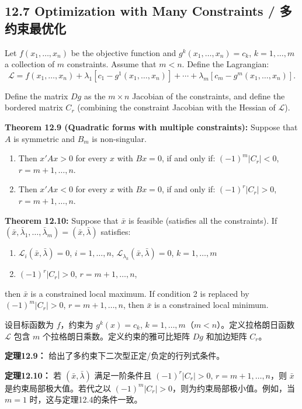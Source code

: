 \subsection{12.7 Optimization with Many Constraints / 多约束最优化}

\begin{original}
Let $f(x_1,\ldots,x_n)$ be the objective function and $g^k(x_1,\ldots,x_n) = c_k$, $k = 1,\ldots,m$ a collection of $m$ constraints. Assume that $m < n$. Define the Lagrangian:
\[
\mathcal{L} = f(x_1,\ldots,x_n) + \lambda_1[c_1 - g^1(x_1,\ldots,x_n)] + \cdots + \lambda_m[c_m - g^m(x_1,\ldots,x_n)].
\]

Define the matrix $Dg$ as the $m \times n$ Jacobian of the constraints, and define the bordered matrix $C_r$ (combining the constraint Jacobian with the Hessian of $\mathcal{L}$).

\textbf{Theorem 12.9 (Quadratic forms with multiple constraints):} Suppose that $A$ is symmetric and $B_m$ is non-singular.
\begin{enumerate}
\item Then $x'Ax > 0$ for every $x$ with $Bx = 0$, if and only if: $(-1)^m|C_r| < 0$, $r = m+1,\ldots,n$.
\item Then $x'Ax < 0$ for every $x$ with $Bx = 0$, if and only if: $(-1)^r|C_r| > 0$, $r = m+1,\ldots,n$.
\end{enumerate}

\textbf{Theorem 12.10:} Suppose that $\bar{x}$ is feasible (satisfies all the constraints). If $(\bar{x}, \bar{\lambda}_1,\ldots,\bar{\lambda}_m) = (\bar{x}, \bar{\lambda})$ satisfies:
\begin{enumerate}
\item $\mathcal{L}_i(\bar{x}, \bar{\lambda}) = 0$, $i = 1,\ldots,n$, $\mathcal{L}_{\lambda_k}(\bar{x}, \bar{\lambda}) = 0$, $k = 1,\ldots,m$
\item $(-1)^r|C_r| > 0$, $r = m+1,\ldots,n$,
\end{enumerate}
then $\bar{x}$ is a constrained local maximum. If condition 2 is replaced by $(-1)^m|C_r| > 0$, $r = m+1,\ldots,n$, then $\bar{x}$ is a constrained local minimum.
\end{original}
\begin{translation}
设目标函数为 $f$，约束为 $g^k(x) = c_k$, $k = 1,\ldots,m$（$m < n$）。定义拉格朗日函数 $\mathcal{L}$ 包含 $m$ 个拉格朗日乘数。定义约束的雅可比矩阵 $Dg$ 和加边矩阵 $C_r$。

\textbf{定理12.9：} 给出了多约束下二次型正定/负定的行列式条件。

\textbf{定理12.10：} 若 $(\bar{x}, \bar{\lambda})$ 满足一阶条件且 $(-1)^r|C_r| > 0$, $r = m+1,\ldots,n$，则 $\bar{x}$ 是约束局部极大值。若代之以 $(-1)^m|C_r| > 0$，则为约束局部极小值。例如，当 $m = 1$ 时，这与定理12.4的条件一致。
\end{translation}

